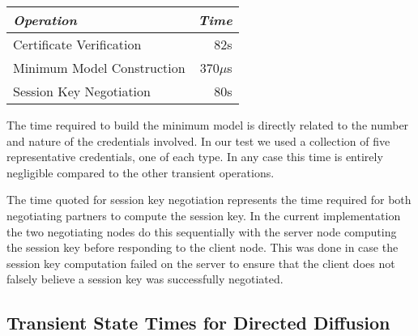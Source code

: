 \begin{table}[tbhp]
  \newcommand\T{\rule{0pt}{2.1ex}}
  \centering
  {
  \begin{tabular}{|l|r|} \hline
    \textit{Operation} \T & \textit{Time} \\ \hline \hline

    Certificate Verification     \T &  82s \\ \hline 
    Minimum Model Construction   \T & 370$\mu$s \\ \hline
    Session Key Negotiation      \T &  80s\\ \hline
  \end{tabular}
  }
  \label{table-transient-time}
\end{table}

The time required to build the minimum model is directly related to the
number and nature of the credentials involved. In our test we used a
collection of five representative credentials, one of each type. In any
case this time is entirely negligible compared to the other transient
operations.


The time quoted for session key negotiation represents the time required
for both negotiating partners to compute the session key. In the current
implementation the two negotiating nodes do this sequentially with the
server node computing the session key before responding to the client
node. This was done in case the session key computation failed on the
server to ensure that the client does not falsely believe a session key
was successfully negotiated.

\subsection{Transient State Times for Directed Diffusion}

